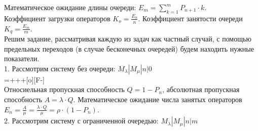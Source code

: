 \documentclass{article}
\begin{document}
Математическое ожидание длины очереди: \begin{math}E_m = \displaystyle\sum_{k = 1}^m P_{n+1} \cdot k \end{math}. \\
Коэффициент загрузки операторов \begin{math}K_o = \displaystyle\frac{E_n}{n}\end{math}.
Коэффициент занятости очереди \begin{math}K_q = \displaystyle\frac{E_m}{m}\end{math}.
\vspace{\baselineskip}
\\Решим задание, рассматривая каждую из задач как частный случай, с помощью предельных переходов (в случае бесконечных очередей) будем находить нужные показатели.
\vspace{\baselineskip}
\\
1. Рассмотрим систему без очереди: \begin{math}M_{\lambda}|M_{\mu}|n|0\end{math}
\vspace{\baselineskip}
\\
\entrymodifiers={+++[o][F-]}
\vspace{\baselineskip}
\\
Относиельная пропускная способность \begin{math}Q = 1 - P_n\end{math}, абсолютная пропускная способность \begin{math}A = \lambda \cdot Q\end{math}. Математическое ожидание числа занятых операторов \begin{math}E_n = \displaystyle\frac{A}{\mu}=\displaystyle\frac{\lambda \cdot Q}{\mu} = \rho \cdot (1 - P_n)\end{math}.
\vspace{\baselineskip}
\\
2. Рассмотрим систему с ограниченной очередью:
\begin{math}M_{\lambda}|M_{\mu}|n|m\end{math}
\vspace{\baselineskip}
\end{document}
